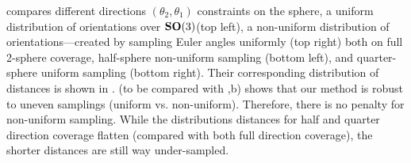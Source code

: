  compares different directions $(\theta_2, \theta_1)$ constraints on the sphere, a uniform distribution of orientations over $\mathrm{\mathbf{SO}}(3)$(top left), a non-uniform distribution of orientations---created by sampling Euler angles uniformly (top right) both on full 2-sphere coverage, half-sphere non-uniform sampling (bottom left), and quarter-sphere uniform sampling (bottom right). %
Their corresponding distribution of distances is shown in .
 (to be compared with ,b) shows that our method is robust to uneven samplings (uniform vs. non-uniform). Therefore, there is no penalty for non-uniform sampling.
While the distributions distances for half and quarter direction coverage flatten (compared with both full direction coverage), the shorter distances are still way under-sampled.

